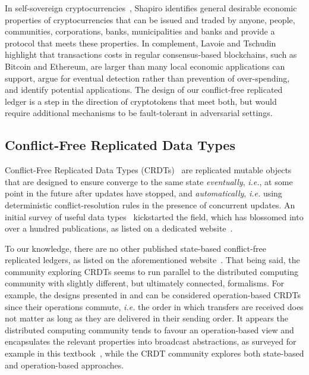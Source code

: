\documentclass[9pt, oneside]{article}   	%
\begin{document}
In self-sovereign cryptocurrencies~\cite{shapiro2023sovereign}, Shapiro identifies general desirable economic properties of cryptocurrencies that can be issued and traded by anyone, people, communities, corporations, banks, municipalities and banks and provide a protocol that meets these properties. In complement, Lavoie and Tschudin~\cite{lavoie2022localcryptotokens} highlight that transactions costs in regular consensus-based blockchains, such as Bitcoin and Ethereum, are larger than many local economic applications can support, argue for eventual detection rather than prevention of over-spending, and identify potential applications. The design of our conflict-free replicated ledger is a step in the direction of cryptotokens that meet both, but would require additional mechanisms to be fault-tolerant in adversarial settings.


\subsection{Conflict-Free Replicated Data Types} 

Conflict-Free Replicated Data Types (CRDTs)~\cite{shapiro:hal-00932836} are replicated mutable objects that are designed to ensure converge to the same state \textit{eventually}, \textit{i.e.}, at some point in the future after updates have stopped, and \textit{automatically}, \textit{i.e.} using deterministic conflict-resolution rules in the presence of concurrent updates. An initial survey of useful data types~\cite{shapiro:inria-00555588} kickstarted the field, which has blossomed into over a hundred publications, as listed on a dedicated website~\cite{crdt-website}.

To our knowledge, there are no other published state-based conflict-free replicated ledgers, as listed on the aforementioned website~\cite{crdt-website}. That being said, the community exploring CRDTs seems to run parallel to the distributed computing community with slightly different, but ultimately connected, formalisms. For example, the designs presented in \cite{guerraoui2021consensus} and \cite{collins2020broadcast-payment} can be considered operation-based CRDTs since their operations commute, \textit{i.e.} the order in which transfers are received does not matter as long as they are delivered in their sending order. It appears the distributed computing community tends to favour an operation-based view and encapsulates the relevant properties into broadcast abstractions, as surveyed for example in this textbook~\cite{cachin2011introduction}, while the CRDT community explores both state-based and operation-based approaches.  
\end{document}

